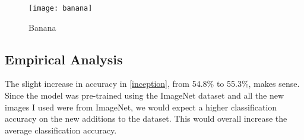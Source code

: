 \begin{figure}
    \texttt{[image: banana]}
    \caption{Banana}
    \label{fig:banana}
\end{figure}

\subsection*{Empirical Analysis}
The slight increase in accuracy in \ref{inception}, from 54.8\% to 55.3\%, makes
sense. Since the model was pre-trained using the ImageNet dataset and all the
new images I used were from ImageNet, we would expect a higher classification
accuracy on the new additions to the dataset. This would overall increase the
average classification accuracy.
